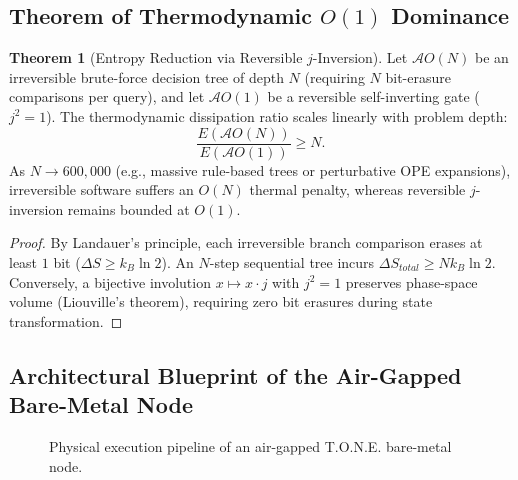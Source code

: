 \documentclass[11pt,a4paper,oneside]{article}
\def\text#1{#1}%
\def\texttt#1{#1}%
\theoremstyle{definition}
\newtheorem{theorem}{Theorem}[section]
\begin{document}
\subsection{Theorem of Thermodynamic $O(1)$ Dominance}
\begin{theorem}[Entropy Reduction via Reversible $j$-Inversion]
Let $\mathcal{A}{O(N)}$ be an irreversible brute-force decision tree of depth $N$ (requiring $N$ bit-erasure comparisons per query), and let $\mathcal{A}{O(1)}$ be a reversible self-inverting gate ($j^2 = 1$). The thermodynamic dissipation ratio scales linearly with problem depth:
\begin{equation}
\frac{E(\mathcal{A}{O(N)})}{E(\mathcal{A}{O(1)})} \ge N.
\end{equation}
As $N \to 600{,}000$ (e.g., massive rule-based trees or perturbative OPE expansions), irreversible software suffers an $O(N)$ thermal penalty, whereas reversible $j$-inversion remains bounded at $O(1)$.
\end{theorem}
\begin{proof}
By Landauer's principle, each irreversible branch comparison erases at least $1$ bit ($\Delta S \ge k_B \ln 2$). An $N$-step sequential tree incurs $\Delta S_{\text{total}} \ge N k_B \ln 2$. Conversely, a bijective involution $x \mapsto x \cdot j$ with $j^2 = 1$ preserves phase-space volume (Liouville's theorem), requiring zero bit erasures during state transformation.
\end{proof}
\subsection{Architectural Blueprint of the Air-Gapped Bare-Metal Node}
\begin{figure}[ht]
\centering
{}
\caption{Physical execution pipeline of an air-gapped T.O.N.E. bare-metal node.}
\end{figure}
\end{document}
